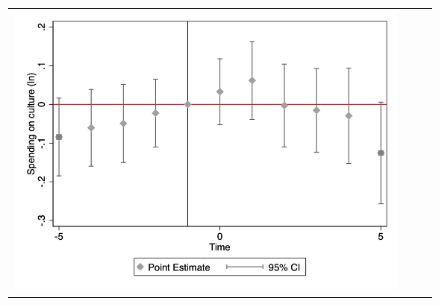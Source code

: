 \begin{figure}[ht]
\begin{tabular}{@{}ccc@{}}
\begin{minipage}[t]{0.32\textwidth}
            \includegraphics[width=\linewidth]{images/eventdd_ln_q4_05_step1.jpg}
            \label{fig:culture}
        \end{minipage} \\[10pt]


\end{tabular}
\end{figure}
